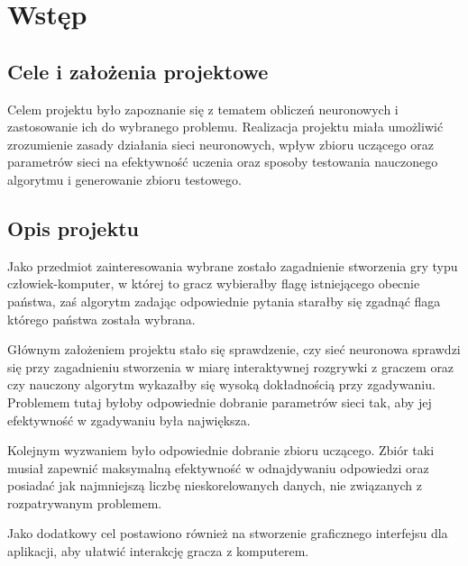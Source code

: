 \chapter{Wstęp}

\section{Cele i założenia projektowe}

Celem projektu było zapoznanie się z tematem obliczeń neuronowych i zastosowanie ich do wybranego problemu. Realizacja projektu miała umożliwić zrozumienie zasady działania sieci neuronowych, wpływ zbioru uczącego oraz parametrów sieci na efektywność uczenia oraz sposoby testowania nauczonego algorytmu i generowanie zbioru testowego.

\section{Opis projektu}

Jako przedmiot zainteresowania wybrane zostało zagadnienie stworzenia gry typu człowiek-komputer, w której to gracz wybierałby flagę istniejącego obecnie państwa, zaś algorytm zadając odpowiednie pytania starałby się zgadnąć flaga którego państwa została wybrana.

Głównym założeniem projektu stało się sprawdzenie, czy sieć neuronowa sprawdzi się przy zagadnieniu stworzenia w miarę interaktywnej rozgrywki z graczem oraz czy nauczony algorytm wykazałby się wysoką dokładnością przy zgadywaniu. Problemem tutaj byłoby odpowiednie dobranie parametrów sieci tak, aby jej efektywność w zgadywaniu była największa.

Kolejnym wyzwaniem było odpowiednie dobranie zbioru uczącego. Zbiór taki musiał zapewnić maksymalną efektywność w odnajdywaniu odpowiedzi oraz posiadać jak najmniejszą liczbę nieskorelowanych danych, nie związanych z rozpatrywanym problemem.

Jako dodatkowy cel postawiono również na stworzenie graficznego interfejsu dla aplikacji, aby ułatwić interakcję gracza z komputerem.